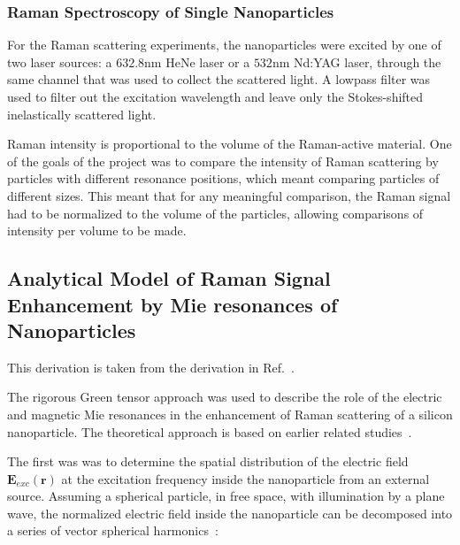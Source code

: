         \subsubsection{Raman Spectroscopy of Single Nanoparticles}
        \label{sec:Raman}
                For the Raman scattering experiments, the nanoparticles were excited by one of two laser sources: a $632.8$nm HeNe laser
            or a $532$nm Nd:YAG laser, through the same channel that was used to collect the scattered light. A lowpass filter was used
            to filter out the excitation wavelength and leave only the Stokes-shifted inelastically scattered light.

                Raman intensity is proportional to the volume of the Raman-active material. One of the goals of the project was to compare
            the intensity of Raman scattering by particles with different resonance positions, which meant comparing particles of different
            sizes. This meant that for any meaningful comparison, the Raman signal had to be normalized to the volume of the particles, allowing
            comparisons of intensity per volume to be made.

    \subsection{Analytical Model of Raman Signal Enhancement by Mie resonances of Nanoparticles}
        \label{sec:Theory}
            This derivation is taken from the derivation in Ref.~.

             The rigorous Green tensor approach was used to describe the role of the electric and magnetic Mie resonances
        in the enhancement of Raman scattering of a silicon nanoparticle. The theoretical approach is based on earlier related
        studies~\cite{canccado2014theory, murphy1983enhanced}.

        The first was was to determine the spatial distribution of the electric field $\mathbf{E}_{exc}(\mathbf{r})$ at the excitation frequency
        inside the nanoparticle from an external source. Assuming a spherical particle, in free space, with illumination by a plane wave,
        the normalized electric field inside the nanoparticle can be decomposed into a series of vector spherical harmonics~\cite{bohren1983absorption}:

